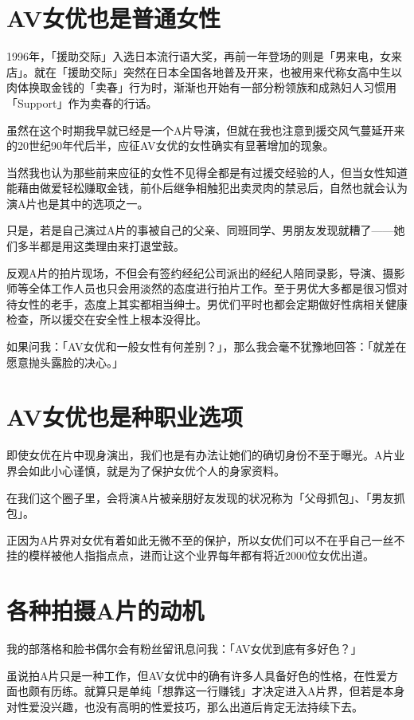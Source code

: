 \documentclass[12pt,UTF8]{ctexbook}
\begin{document}
\section{AV女优也是普通女性}

1996年，「援助交际」入选日本流行语大奖，再前一年登场的则是「男来电，女来店」。就在「援助交际」突然在日本全国各地普及开来，也被用来代称女高中生以肉体换取金钱的「卖春」行为时，渐渐也开始有一部分粉领族和成熟妇人习惯用「Support」作为卖春的行话。

虽然在这个时期我早就已经是一个A片导演，但就在我也注意到援交风气蔓延开来的20世纪90年代后半，应征AV女优的女性确实有显著增加的现象。

当然我也认为那些前来应征的女性不见得全都是有过援交经验的人，但当女性知道能藉由做爱轻松赚取金钱，前仆后继争相触犯出卖灵肉的禁忌后，自然也就会认为演A片也是其中的选项之一。

只是，若是自己演过A片的事被自己的父亲、同班同学、男朋友发现就糟了——她们多半都是用这类理由来打退堂鼓。

反观A片的拍片现场，不但会有签约经纪公司派出的经纪人陪同录影，导演、摄影师等全体工作人员也只会用淡然的态度进行拍片工作。至于男优大多都是很习惯对待女性的老手，态度上其实都相当绅士。男优们平时也都会定期做好性病相关健康检查，所以援交在安全性上根本没得比。

如果问我：「AV女优和一般女性有何差别？」，那么我会毫不犹豫地回答：「就差在愿意抛头露脸的决心。」

\section{AV女优也是种职业选项}

即使女优在片中现身演出，我们也是有办法让她们的确切身份不至于曝光。A片业界会如此小心谨慎，就是为了保护女优个人的身家资料。

在我们这个圈子里，会将演A片被亲朋好友发现的状况称为「父母抓包」、「男友抓包」。

正因为A片界对女优有着如此无微不至的保护，所以女优们可以不在乎自己一丝不挂的模样被他人指指点点，进而让这个业界每年都有将近2000位女优出道。

\section{各种拍摄A片的动机}

我的部落格和脸书偶尔会有粉丝留讯息问我：「AV女优到底有多好色？」

虽说拍A片只是一种工作，但AV女优中的确有许多人具备好色的性格，在性爱方面也颇有历练。就算只是单纯「想靠这一行赚钱」才决定进入A片界，但若是本身对性爱没兴趣，也没有高明的性爱技巧，那么出道后肯定无法持续下去。
\end{document}
